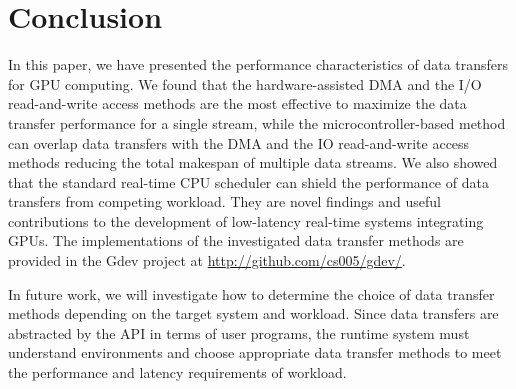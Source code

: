 \section{Conclusion}
\label{sec:conclusion}

In this paper, we have presented the performance characteristics of data
transfers for GPU computing. 
We found that the hardware-assisted DMA and the I/O read-and-write
access methods are the most effective to maximize the data transfer
performance for a single stream, while the microcontroller-based method
can overlap data transfers with the DMA and the IO read-and-write access
methods reducing the total makespan of multiple data streams.
We also showed that the standard real-time CPU scheduler can
shield the performance of data transfers from competing workload.
They are novel findings and useful contributions to the development of
low-latency real-time systems integrating GPUs.
The implementations of the investigated data transfer methods are
provided in the Gdev project at \url{http://github.com/cs005/gdev/}.

In future work, we will investigate how to determine the choice of data
transfer methods depending on the target system and workload.
Since data transfers are abstracted by the API in terms of user
programs, the runtime system must understand environments and choose
appropriate data transfer methods to meet the performance and latency
requirements of workload.

